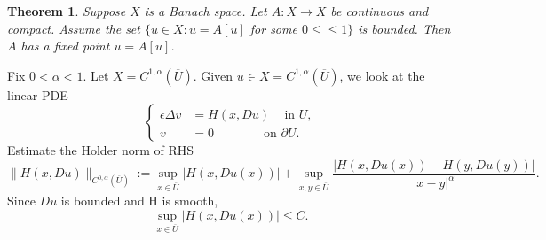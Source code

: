 \documentclass[11pt,reqno]{amsart}
\numberwithin{figure}{section}
\theoremstyle{plain}
\newtheorem{thm}{Theorem}[section]
\theoremstyle{remark}
\numberwithin{equation}{section}
\begin{document}
\begin{appendices}
\begin{thm} Suppose $X$ is a Banach space. Let $A:X \to X$ be continuous and compact. Assume the set $\{u\in X : u=  A[u]$ for some $0 \leq    \leq 1\}$ is bounded. Then $A$ has a fixed point $u =A[u]$.
\end{thm}
\noindent Fix $0<\alpha<1$. Let $X=C^{1,\alpha}(\overline{U})$. Given $u \in X=C^{1,\alpha}(\overline{U})$, we look at the linear PDE
\begin{equation}
\label{fix}
\left\{
  \begin{aligned}
   \epsilon \Delta v &= H(x, Du) \quad \, \text{in } U, \\
              v &= 0 \qquad \qquad \text{on } \partial U.
  \end{aligned}
\right.
\end{equation}
\noindent
Estimate the Holder norm of RHS
$$\|H(x, Du)\|_{C^{0, \alpha}(\overline{U})}:=\sup_{x\in\overline{U}} |H(x,Du(x))| + \sup_{x, y \in \overline{U}}\frac{|H(x, Du(x))-H(y, Du(y))|}{|x-y|^\alpha}.$$
Since $Du$ is bounded and H is smooth,
\begin{equation}
    \sup_{x\in\overline{U}} |H(x,Du(x))| \leq C.
\end{equation}


\end{appendices}
\end{document}
